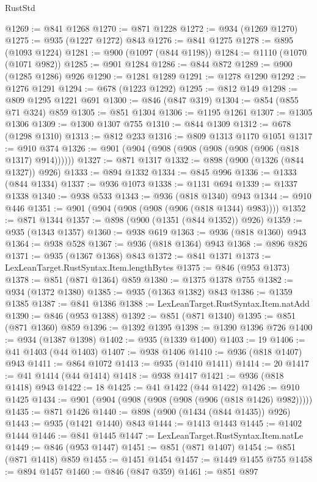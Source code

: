 \begin{lexlean}{RustStd}
\begin{coremodule}
@1269 := @841 @1268
@1270 := @871 @1228
@1272 := @934 (@1269 @1270)
@1275 := @935 (@1227 @1272) @843
@1276 := @841 @1275
@1278 := @895 (@1093 @1224)
@1281 := @900 (@1097 (@844 @1198))
@1284 := @1110 (@1070 (@1071 @982))
@1285 := @901 @1284
@1286 := @844 @872
@1289 := @900 (@1285 @1286) @926
@1290 := @1281 @1289
@1291 := @1278 @1290
@1292 := @1276 @1291
@1294 := @678 (@1223 @1292)
@1295 := @812 @149
@1298 := @809 @1295 @1221 @691
@1300 := @846 (@847 @319)
@1304 := @854 (@855 @71 @324) @859
@1305 := @851 @1304
@1306 := @1195 @1261
@1307 := @1305 @1306
@1309 := @1300 @1307 @755
@1310 := @844 @1309
@1312 := @678 (@1298 @1310)
@1313 := @812 @233
@1316 := @809 @1313 @1170 @1051
@1317 := @910 @374
@1326 := @901 (@904 (@908 (@908 (@908 (@908 (@906 (@818 @1317) @914))))))
@1327 := @871 @1317
@1332 := @898 (@900 (@1326 (@844 @1327)) @926)
@1333 := @894 @1332
@1334 := @845 @996
@1336 := @1333 (@844 @1334)
@1337 := @936 @1073
@1338 := @1131 @694
@1339 := @1337 @1338
@1340 := @938 @533
@1343 := @936 (@818 @1340) @943
@1344 := @910 @446
@1351 := @901 (@904 (@908 (@908 (@906 (@818 @1344) @983))))
@1352 := @871 @1344
@1357 := @898 (@900 (@1351 (@844 @1352)) @926)
@1359 := @935 (@1343 @1357)
@1360 := @938 @619
@1363 := @936 (@818 @1360) @943
@1364 := @938 @528
@1367 := @936 (@818 @1364) @943
@1368 := @896 @826
@1371 := @935 (@1367 @1368) @843
@1372 := @841 @1371
@1373 := LexLeanTarget.RustSyntax.Item.lengthBytes
@1375 := @846 (@953 @1373)
@1378 := @851 (@871 @1364) @859
@1380 := @1375 @1378 @755
@1382 := @934 (@1372 @1380)
@1385 := @935 (@1363 @1382) @843
@1386 := @1359 @1385
@1387 := @841 @1386
@1388 := LexLeanTarget.RustSyntax.Item.natAdd
@1390 := @846 (@953 @1388)
@1392 := @851 (@871 @1340)
@1395 := @851 (@871 @1360) @859
@1396 := @1392 @1395
@1398 := @1390 @1396 @726
@1400 := @934 (@1387 @1398)
@1402 := @935 (@1339 @1400)
@1403 := 19
@1406 := @41 @1403 (@44 @1403)
@1407 := @938 @1406
@1410 := @936 (@818 @1407) @943
@1411 := @864 @1072
@1413 := @935 (@1410 @1411)
@1414 := 20
@1417 := @41 @1414 (@44 @1414)
@1418 := @938 @1417
@1421 := @936 (@818 @1418) @943
@1422 := 18
@1425 := @41 @1422 (@44 @1422)
@1426 := @910 @1425
@1434 := @901 (@904 (@908 (@908 (@908 (@906 (@818 @1426) @982)))))
@1435 := @871 @1426
@1440 := @898 (@900 (@1434 (@844 @1435)) @926)
@1443 := @935 (@1421 @1440) @843
@1444 := @1413 @1443
@1445 := @1402 @1444
@1446 := @841 @1445
@1447 := LexLeanTarget.RustSyntax.Item.natLe
@1449 := @846 (@953 @1447)
@1451 := @851 (@871 @1407)
@1454 := @851 (@871 @1418) @859
@1455 := @1451 @1454
@1457 := @1449 @1455 @755
@1458 := @894 @1457
@1460 := @846 (@847 @359)
@1461 := @851 @897

\end{coremodule}
\end{lexlean}
